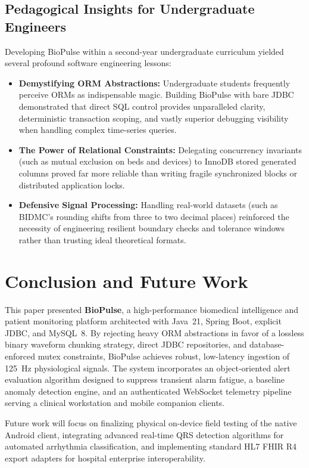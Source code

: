 \documentclass[10pt,journal,compsoc]{IEEEtran}
\begin{document}
\subsection{Pedagogical Insights for Undergraduate Engineers}
Developing BioPulse within a second-year undergraduate curriculum yielded several profound software engineering lessons:
\begin{itemize}
    \item \textbf{Demystifying ORM Abstractions:} Undergraduate students frequently perceive ORMs as indispensable magic. Building BioPulse with bare JDBC demonstrated that direct SQL control provides unparalleled clarity, deterministic transaction scoping, and vastly superior debugging visibility when handling complex time-series queries.
    \item \textbf{The Power of Relational Constraints:} Delegating concurrency invariants (such as mutual exclusion on beds and devices) to InnoDB stored generated columns proved far more reliable than writing fragile synchronized blocks or distributed application locks.
    \item \textbf{Defensive Signal Processing:} Handling real-world datasets (such as BIDMC's rounding shifts from three to two decimal places) reinforced the necessity of engineering resilient boundary checks and tolerance windows rather than trusting ideal theoretical formats.
\end{itemize}

\section{Conclusion and Future Work}
\label{sec:conclusion}

This paper presented \textbf{BioPulse}, a high-performance biomedical intelligence and patient monitoring platform architected with Java~21, Spring Boot, explicit JDBC, and MySQL~8. By rejecting heavy ORM abstractions in favor of a lossless binary waveform chunking strategy, direct JDBC repositories, and database-enforced mutex constraints, BioPulse achieves robust, low-latency ingestion of 125~Hz physiological signals. The system incorporates an object-oriented alert evaluation algorithm designed to suppress transient alarm fatigue, a baseline anomaly detection engine, and an authenticated WebSocket telemetry pipeline serving a clinical workstation and mobile companion clients.

Future work will focus on finalizing physical on-device field testing of the native Android client, integrating advanced real-time QRS detection algorithms for automated arrhythmia classification, and implementing standard HL7 FHIR R4 export adapters for hospital enterprise interoperability.
\end{document}
